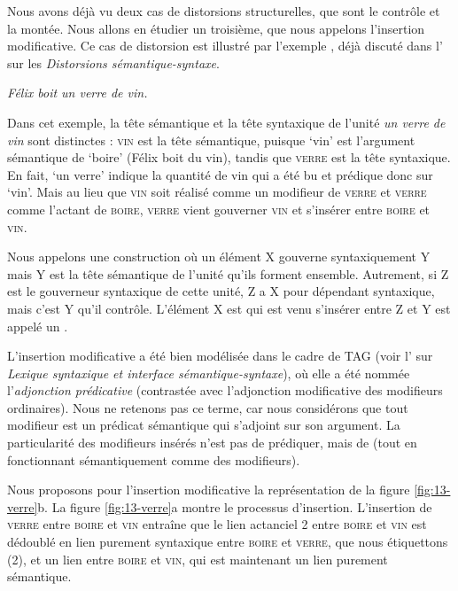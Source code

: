 Nous avons déjà vu deux cas de distorsions structurelles, que sont le contrôle et la montée. Nous allons en étudier un troisième, que nous appelons l’insertion modificative. Ce cas de distorsion est illustré par l’exemple , déjà discuté dans l’ sur les \textit{Distorsions sémantique-syntaxe}.

\ea\label{ex:13-verre} \textit{Félix boit un verre de vin.}\z

Dans cet exemple, la tête sémantique et la tête syntaxique de l’unité \textit{un verre de vin} sont distinctes : \textsc{vin} est la tête sémantique, puisque ‘vin’ est l’argument sémantique de ‘boire’ (Félix boit du vin), tandis que \textsc{verre} est la tête syntaxique. En fait, ‘un verre’ indique la quantité de vin qui a été bu et prédique donc sur ‘vin’. Mais au lieu que \textsc{vin} soit réalisé comme un modifieur de \textsc{verre} et \textsc{verre} comme l’actant de \textsc{boire}, \textsc{verre} vient gouverner \textsc{vin} et s’insérer entre \textsc{boire} et \textsc{vin}.

{Nous appelons  une construction où un élément X gouverne syntaxiquement Y mais Y est la tête sémantique de l’unité qu’ils forment ensemble. Autrement, si Z est le gouverneur syntaxique de cette unité, Z a X pour dépendant syntaxique, mais c’est Y qu’il contrôle. L’élément X est qui est venu s’insérer entre Z et Y est appelé un .}

L’insertion modificative a été bien modélisée dans le cadre de TAG (voir l’ sur \textit{Lexique syntaxique et interface sémantique-syntaxe}), où elle a été nommée l’\textit{adjonction prédicative} (contrastée avec l’adjonction modificative des modifieurs ordinaires). Nous ne retenons pas ce terme, car nous considérons que tout modifieur est un prédicat sémantique qui s’adjoint sur son argument. La particularité des modifieurs insérés n'est pas de prédiquer, mais de  (tout en fonctionnant sémantiquement comme des modifieurs).

Nous proposons pour l’insertion modificative la représentation de la figure \ref{fig:13-verre}b. La figure \ref{fig:13-verre}a montre le processus d’insertion. L'insertion de \textsc{verre} entre \textsc{boire} et \textsc{vin} entraîne que le lien actanciel 2 entre \textsc{boire} et \textsc{vin} est dédoublé en lien purement syntaxique entre \textsc{boire} et \textsc{verre}, que nous étiquettons (2), et un lien entre \textsc{boire} et \textsc{vin}, qui est maintenant un lien purement sémantique.

